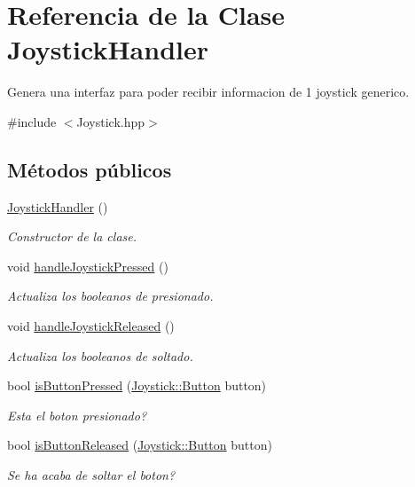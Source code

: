 \hypertarget{class_joystick_handler}{}\section{Referencia de la Clase Joystick\+Handler}
\label{class_joystick_handler}


Genera una interfaz para poder recibir informacion de 1 joystick generico.  




{\ttfamily \#include $<$Joystick.\+hpp$>$}

\subsection*{Métodos públicos}
\begin{DoxyCompactItemize}
\item 
\hyperlink{class_joystick_handler_af0f8c31b1d75c758f8052a4abd88b010}{Joystick\+Handler} ()
\begin{DoxyCompactList}\small\item\em Constructor de la clase. \end{DoxyCompactList}\item 
void \hyperlink{class_joystick_handler_a3d5b8327c9322fe918667009fe634157}{handle\+Joystick\+Pressed} ()
\begin{DoxyCompactList}\small\item\em Actualiza los booleanos de presionado. \end{DoxyCompactList}\item 
void \hyperlink{class_joystick_handler_a3cb605e98d099df17c840cc73decb2ec}{handle\+Joystick\+Released} ()
\begin{DoxyCompactList}\small\item\em Actualiza los booleanos de soltado. \end{DoxyCompactList}\item 
bool \hyperlink{class_joystick_handler_ac22a5dcf49a0d1a5ce5e03296bd0d7ca}{is\+Button\+Pressed} (\hyperlink{namespace_joystick_a45a955286b817c291c510e63a0599cd9}{Joystick\+::\+Button} button)
\begin{DoxyCompactList}\small\item\em Esta el boton presionado? \end{DoxyCompactList}\item 
bool \hyperlink{class_joystick_handler_af4aa84e643da933cac307fd37c08fc31}{is\+Button\+Released} (\hyperlink{namespace_joystick_a45a955286b817c291c510e63a0599cd9}{Joystick\+::\+Button} button)
\begin{DoxyCompactList}\small\item\em Se ha acaba de soltar el boton? \end{DoxyCompactList}\end{DoxyCompactItemize}



